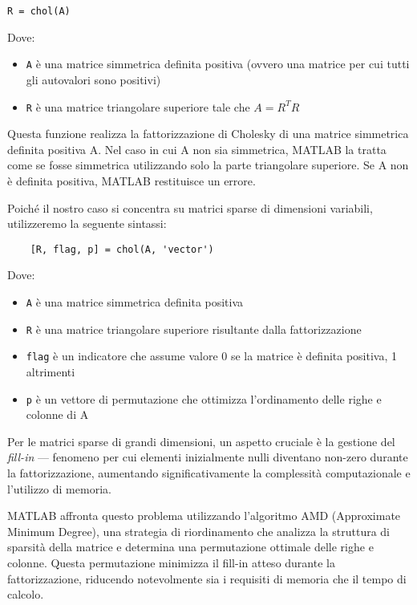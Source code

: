 \begin{verbatim}
R = chol(A)   
\end{verbatim}

Dove: 
\begin{itemize}
    \item \texttt{A} è una matrice simmetrica definita positiva (ovvero una matrice per cui tutti gli autovalori sono positivi)
    \item \texttt{R} è una matrice triangolare superiore tale che $A = R^T R$
\end{itemize}

Questa funzione realizza la fattorizzazione di Cholesky di una matrice simmetrica definita positiva A.
Nel caso in cui A non sia simmetrica, MATLAB la tratta come se fosse simmetrica utilizzando solo la parte triangolare superiore.
Se A non è definita positiva, MATLAB restituisce un errore.

Poiché il nostro caso si concentra su matrici sparse di dimensioni variabili, utilizzeremo la seguente sintassi:

\begin{verbatim}
    [R, flag, p] = chol(A, 'vector')
\end{verbatim}
Dove: 
\begin{itemize}
    \item \texttt{A} è una matrice simmetrica definita positiva
    \item \texttt{R} è una matrice triangolare superiore risultante dalla fattorizzazione
    \item \texttt{flag} è un indicatore che assume valore 0 se la matrice è definita positiva, 1 altrimenti
    \item \texttt{p} è un vettore di permutazione che ottimizza l'ordinamento delle righe e colonne di A
\end{itemize}

Per le matrici sparse di grandi dimensioni, un aspetto cruciale è la gestione del \textit{fill-in} 
— fenomeno per cui elementi inizialmente nulli diventano non-zero durante la fattorizzazione, 
aumentando significativamente la complessità computazionale e l'utilizzo di memoria.

MATLAB affronta questo problema utilizzando l'algoritmo AMD (Approximate Minimum Degree), 
una strategia di riordinamento che analizza la struttura di sparsità della matrice 
e determina una permutazione ottimale delle righe e colonne. 
Questa permutazione minimizza il fill-in atteso durante la fattorizzazione, 
riducendo notevolmente sia i requisiti di memoria che il tempo di calcolo.

